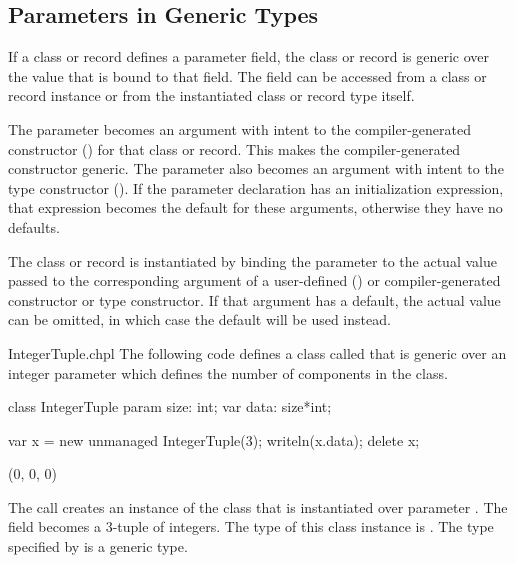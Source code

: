 \subsection{Parameters in Generic Types}
\label{Parameters_in_Generic_Types}

If a class or record defines a parameter field, the class or record
is generic over the value that is bound to that field.
The field can be accessed from a class or record instance or from the
instantiated class or record type itself.

The parameter becomes an argument with intent  to the
compiler-generated constructor ()
for that class or record.  This makes the compiler-generated
constructor generic.  The parameter also becomes an argument
with intent  to the type  constructor ().
If the parameter declaration has an initialization expression, that expression
becomes the default for these arguments, otherwise they have no defaults.

The class or record is instantiated by binding the parameter
to the actual value passed to the corresponding argument of
a user-defined ()
or compiler-generated constructor or type constructor.
If that argument has a default, the actual value can be omitted, in
which case the default will be used instead.

\begin{chapelexample}{IntegerTuple.chpl}
The following code defines a class called  that is
generic over an integer parameter which defines the number of
components in the class.
\begin{chapel}
class IntegerTuple {
  param size: int;
  var data: size*int;
}
\end{chapel}
\begin{chapelpost}
var x = new unmanaged IntegerTuple(3);
writeln(x.data);
delete x;
\end{chapelpost}
\begin{chapeloutput}
(0, 0, 0)
\end{chapeloutput}
The call  creates an instance of the
 class that is instantiated over parameter
.  The field  becomes a 3-tuple of integers.  The
type of this class instance is .  The type
specified by  is a generic type.
\end{chapelexample}

